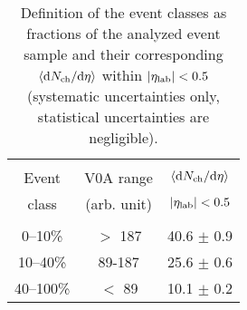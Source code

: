 \begin{table}[t] 
  \centering
  \begin{tabular*}{\linewidth}{@{\extracolsep{\fill}}ccc}
    \hline
    &&\\[-0.7em]
     Event & V0A range & $\left\langle\mathrm{d}N_\mathrm{ch}/\mathrm{d}\eta\right\rangle$\\
     class & \footnotesize{(arb. unit)} & \footnotesize{$|\eta_{\rm lab}|<0.5$}\\[0.3em]
    \hline
    &&\\[-0.7em]
    0--10\%   & $>$ 187  & 40.6 $\pm$ 0.9 \\[0.3em]
    10--40\%  & 89-187   & 25.6 $\pm$ 0.6 \\[0.3em]
    40--100\% & $<$ 89   & 10.1 $\pm$ 0.2 \\[0.3em]
    \hline
  \end{tabular*}
  \caption{Definition of the event classes as fractions of the analyzed event sample and their corresponding $\left\langle\mathrm{d}N_\mathrm{ch}/\mathrm{d}\eta\right\rangle$ within $|\eta_{\rm lab}|<0.5$ (systematic uncertainties only, statistical uncertainties are negligible).  }
  \label{tab:multclasses}
\end{table}
